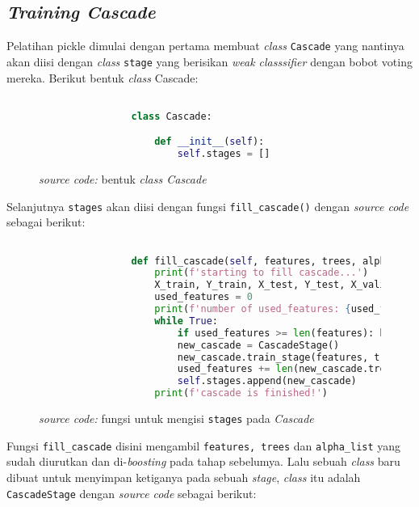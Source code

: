 	\subsection{\textit{Training Cascade}}
		
		Pelatihan pickle dimulai dengan pertama membuat \textit{class} \texttt{Cascade} yang 
		nantinya akan diisi dengan \textit{class} \texttt{stage} yang berisikan \emph{weak classsifier} 
		dengan bobot voting mereka. Berikut bentuk \textit{class} Cascade:

		\begin{figure}[H]
			\begin{lstlisting}[language=Python, basicstyle=\tiny]

				class Cascade:

					def __init__(self):
						self.stages = []

			\end{lstlisting}
			\caption{\emph{source code:} bentuk \textit{class Cascade}}
			\label{code: Cascade class}
		\end{figure}

		Selanjutnya \texttt{stages} akan diisi dengan fungsi \texttt{fill\_cascade()} dengan 
		\textit{source code} sebagai berikut:

		\begin{figure}[H]
			\begin{lstlisting}[language=Python, basicstyle=\tiny]

				def fill_cascade(self, features, trees, alpha_list, splits):
					print(f'starting to fill cascade...')
					X_train, Y_train, X_test, Y_test, X_valid, Y_valid = splits
					used_features = 0
					print(f'number of used_features: {used_features}')
					while True:
						if used_features >= len(features): break
						new_cascade = CascadeStage()
						new_cascade.train_stage(features, trees, alpha_list, X_valid, Y_valid, used_features)
						used_features += len(new_cascade.trees) #check the total number of features used
						self.stages.append(new_cascade)
					print(f'cascade is finished!')

			\end{lstlisting}
			\caption{\emph{source code:} fungsi untuk mengisi \texttt{stages} pada 
			\emph{Cascade}}
			\label{code: fill cascade function}
		\end{figure}

		Fungsi \texttt{fill\_cascade} disini mengambil \texttt{features, trees} dan \texttt{alpha\_list} 
		yang sudah diurutkan dan di-\emph{boosting} pada tahap sebelumya. Lalu sebuah \textit{class} 
		baru dibuat untuk menyimpan ketiganya pada sebuah \emph{stage}, \textit{class} itu adalah 
		\texttt{CascadeStage} dengan \textit{source code} sebagai berikut:

